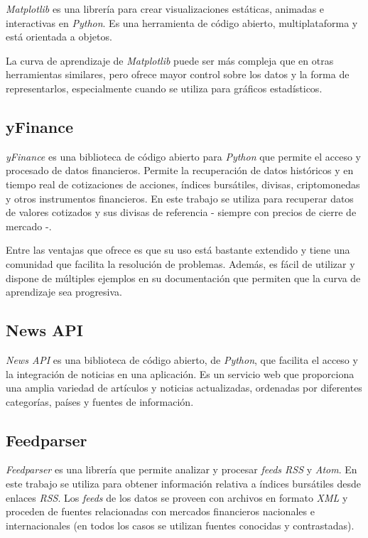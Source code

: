 \emph{Matplotlib} \citep{online:matplotlib} es una librería para crear visualizaciones estáticas, animadas e interactivas en \emph{Python}. Es una herramienta de código abierto, multiplataforma y está orientada a objetos. 

La curva de aprendizaje de \emph{Matplotlib} puede ser más compleja que en otras herramientas similares, pero ofrece mayor control sobre los datos y la forma de representarlos, especialmente cuando se utiliza para gráficos estadísticos. 

\subsection{yFinance}\label{yfinance}

\emph{yFinance} \citep{online:yfinance} es una biblioteca de código abierto para \emph{Python} que permite el acceso y procesado de datos financieros. Permite la recuperación de datos históricos y en tiempo real de cotizaciones de acciones, índices bursátiles, divisas, criptomonedas y otros instrumentos financieros. En este trabajo se utiliza para recuperar datos de valores cotizados y sus divisas de referencia - siempre con precios de cierre de mercado -. 

Entre las ventajas que ofrece es que su uso está bastante extendido y tiene una comunidad que facilita la resolución de problemas. Además, es fácil de utilizar y dispone de múltiples ejemplos en su documentación que permiten que la curva de aprendizaje sea progresiva. 

\subsection{News API}\label{news_api}

\emph{News API} \citep{online:news_api} es una biblioteca de código abierto, de \emph{Python}, que facilita el acceso y
la integración de noticias en una aplicación. Es un servicio web que proporciona una amplia variedad de artículos y noticias actualizadas, ordenadas por diferentes categorías, países y fuentes de información. 

\subsection{Feedparser}\label{feedparser}

\emph{Feedparser} \citep{online:feedparser} es una librería que permite analizar y procesar \emph{feeds RSS} y \emph{Atom}. En este trabajo se utiliza para obtener información relativa a índices bursátiles desde enlaces \emph{RSS}. Los \emph{feeds} de los datos se proveen con archivos en formato \emph{XML} y proceden de fuentes relacionadas con mercados financieros nacionales e internacionales (en todos los casos se utilizan fuentes conocidas y contrastadas). 

